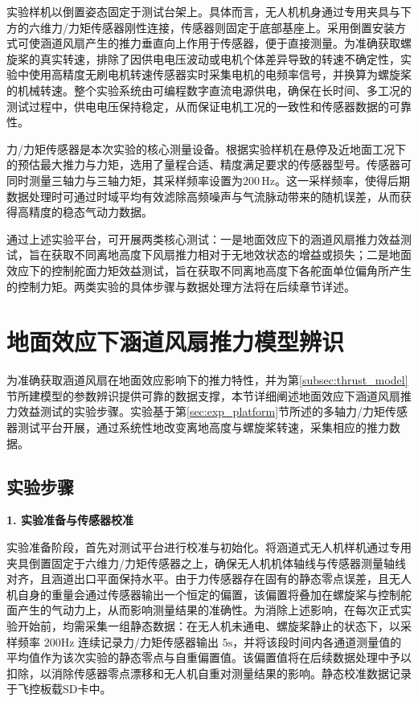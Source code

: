 实验样机以倒置姿态固定于测试台架上。具体而言，无人机机身通过专用夹具与下方的六维力/力矩传感器刚性连接，传感器则固定于底部基座上。采用倒置安装方式可使涵道风扇产生的推力垂直向上作用于传感器，便于直接测量。为准确获取螺旋桨的真实转速，排除了因供电电压波动或电机个体差异导致的转速不确定性，实验中使用高精度无刷电机转速传感器实时采集电机的电频率信号，并换算为螺旋桨的机械转速。整个实验系统由可编程数字直流电源供电，确保在长时间、多工况的测试过程中，供电电压保持稳定，从而保证电机工况的一致性和传感器数据的可靠性。

力/力矩传感器是本次实验的核心测量设备。根据实验样机在悬停及近地面工况下的预估最大推力与力矩，选用了量程合适、精度满足要求的传感器型号。传感器可同时测量三轴力与三轴力矩，其采样频率设置为$200\,\mathrm{Hz}$。这一采样频率，使得后期数据处理时可通过时域平均有效滤除高频噪声与气流脉动带来的随机误差，从而获得高精度的稳态气动力数据。

通过上述实验平台，可开展两类核心测试：一是地面效应下的涵道风扇推力效益测试，旨在获取不同离地高度下风扇推力相对于无地效状态的增益或损失；二是地面效应下的控制舵面力矩效益测试，旨在获取不同离地高度下各舵面单位偏角所产生的控制力矩。两类实验的具体步骤与数据处理方法将在后续章节详述。

\section{地面效应下涵道风扇推力模型辨识}
\label{sec:GE_exp}
为准确获取涵道风扇在地面效应影响下的推力特性，并为第\ref{subsec:thrust_model}节所建模型的参数辨识提供可靠的数据支撑，本节详细阐述地面效应下涵道风扇推力效益测试的实验步骤。实验基于第\ref{sec:exp_platform}节所述的多轴力/力矩传感器测试平台开展，通过系统性地改变离地高度与螺旋桨转速，采集相应的推力数据。

\subsection{实验步骤}

\textbf{1. 实验准备与传感器校准}

实验准备阶段，首先对测试平台进行校准与初始化。将涵道式无人机样机通过专用夹具倒置固定于六维力/力矩传感器之上，确保无人机机体轴线与传感器测量轴线对齐，且涵道出口平面保持水平。由于力传感器存在固有的静态零点误差，且无人机自身的重量会通过传感器输出一个恒定的偏置，该偏置将叠加在螺旋桨与控制舵面产生的气动力上，从而影响测量结果的准确性。为消除上述影响，在每次正式实验开始前，均需采集一组静态数据：在无人机未通电、螺旋桨静止的状态下，以采样频率 $200\mathrm{Hz}$ 连续记录力/力矩传感器输出 $5\mathrm{s}$，并将该段时间内各通道测量值的平均值作为该次实验的静态零点与自重偏置值。该偏置值将在后续数据处理中予以扣除，以消除传感器零点漂移和无人机自重对测量结果的影响。静态校准数据记录于飞控板载SD卡中。

